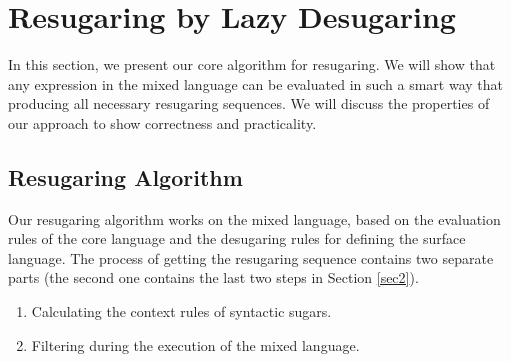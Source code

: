 
\section{Resugaring by Lazy Desugaring}
\label{sec:algo}

In this section, we present our core algorithm for resugaring.  We will show that any expression in the mixed language can be evaluated in such a smart way that producing all necessary resugaring sequences. We will discuss the properties of our approach to show correctness and practicality.




\subsection{Resugaring Algorithm}

Our resugaring algorithm works on the mixed language, based on the evaluation rules of the core language and the desugaring rules for defining the surface language. The process of getting the resugaring sequence contains two separate parts (the second one contains the last two steps in Section \ref{sec2}).

\begin{enumerate}
\item Calculating the context rules of syntactic sugars.
\item Filtering  during the execution of the mixed language.
\end{enumerate}



